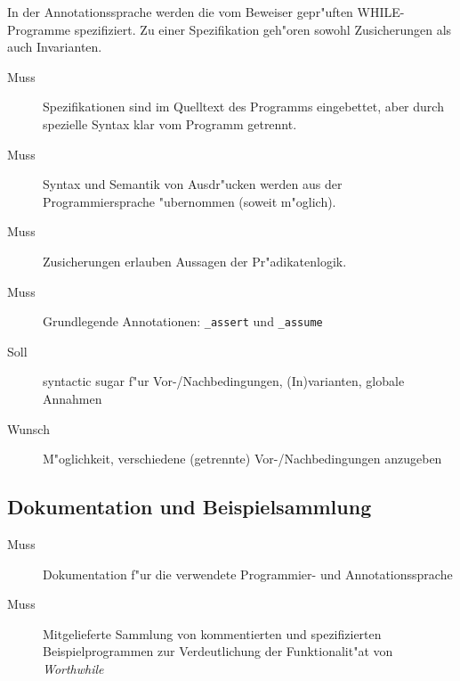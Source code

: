 In der \see Annotationssprache werden die vom Beweiser gepr"uften WHILE-Programme spezifiziert. Zu einer Spezifikation geh"oren sowohl Zusicherungen als auch Invarianten.%

\begin{description}%
    \item [Muss] Spezifikationen sind im Quelltext des Programms eingebettet, aber durch spezielle Syntax klar vom Programm getrennt.%
    \item [Muss] Syntax und Semantik von Ausdr"ucken werden aus der Programmiersprache "ubernommen (soweit m"oglich).%
    \item [Muss] Zusicherungen erlauben Aussagen der \see Pr"adikatenlogik.%
    \item [Muss] Grundlegende Annotationen: \texttt{\_assert} und \texttt{\_assume}%
    \item [Soll] syntactic sugar f"ur \see Vor-/Nachbedingungen, \see (In)varianten, \see globale Annahmen%
    \item [Wunsch] M"oglichkeit, verschiedene (getrennte) Vor-/Nachbedingungen anzugeben%
\end{description}%

\subsection{Dokumentation und Beispielsammlung}%

\begin{description}%
    \item [Muss] Dokumentation f"ur die verwendete Programmier- und Annotationssprache%
    \item [Muss] Mitgelieferte Sammlung von kommentierten und spezifizierten Beispielprogrammen zur Verdeutlichung der Funktionalit"at von \textit{Worthwhile}%
\end{description}%
